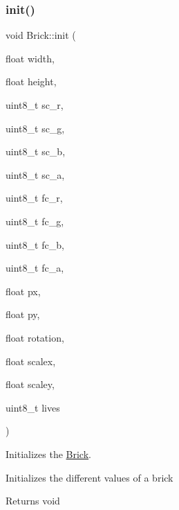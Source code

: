 \subsubsection{\texorpdfstring{init()}{init()}}
{\footnotesize\ttfamily void Brick\+::init (\begin{DoxyParamCaption}\item[{float}]{width,  }\item[{float}]{height,  }\item[{uint8\+\_\+t}]{sc\+\_\+r,  }\item[{uint8\+\_\+t}]{sc\+\_\+g,  }\item[{uint8\+\_\+t}]{sc\+\_\+b,  }\item[{uint8\+\_\+t}]{sc\+\_\+a,  }\item[{uint8\+\_\+t}]{fc\+\_\+r,  }\item[{uint8\+\_\+t}]{fc\+\_\+g,  }\item[{uint8\+\_\+t}]{fc\+\_\+b,  }\item[{uint8\+\_\+t}]{fc\+\_\+a,  }\item[{float}]{px,  }\item[{float}]{py,  }\item[{float}]{rotation,  }\item[{float}]{scalex,  }\item[{float}]{scaley,  }\item[{uint8\+\_\+t}]{lives }\end{DoxyParamCaption})}



Initializes the \hyperlink{class_brick}{Brick}. 

Initializes the different values of a brick

\begin{DoxyReturn}{Returns}
void 
\end{DoxyReturn}

